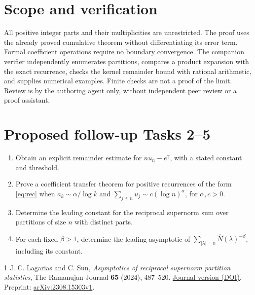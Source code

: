 \documentclass[11pt]{article}
\begin{document}
\section*{Scope and verification}
All positive integer parts and their multiplicities are unrestricted.
The proof uses the already proved cumulative theorem without differentiating
its error term. Formal coefficient operations require no boundary convergence.
The companion verifier independently enumerates partitions, compares a
product expansion with the exact recurrence, checks the kernel remainder
bound with rational arithmetic, and supplies numerical examples.
Finite checks are not a proof of the limit. Review is by the authoring
agent only, without independent peer review or a proof assistant.

\section*{Proposed follow-up Tasks 2--5}
\begin{enumerate}[label=Task \arabic*:,start=2,leftmargin=4.6em]
\item Obtain an explicit remainder estimate for $nu_n-e^\gamma$, with a
stated constant and threshold.
\item Prove a coefficient transfer theorem for positive recurrences of the
form \eqref{eq:rec} when $a_k\sim\alpha/\log k$ and
$\sum_{j\le n}u_j\sim c(\log n)^\alpha$, for $\alpha,c>0$.
\item Determine the leading constant for the reciprocal supernorm sum over
partitions of size $n$ with distinct parts.
\item For each fixed $\beta>1$, determine the leading asymptotic of
$\sum_{|\lambda|=n}\widehat N(\lambda)^{-\beta}$, including its constant.
\end{enumerate}

\begin{thebibliography}{1}
 J. C. Lagarias and C. Sun,
\emph{Asymptotics of reciprocal supernorm partition statistics},
The Ramanujan Journal \textbf{65} (2024), 487--520.
\href{https://doi.org/10.1007/s11139-024-00893-8}{Journal version (DOI)}.
Preprint: \href{https://arxiv.org/abs/2308.15303}{arXiv:2308.15303v1}.
\end{thebibliography}
\end{document}
